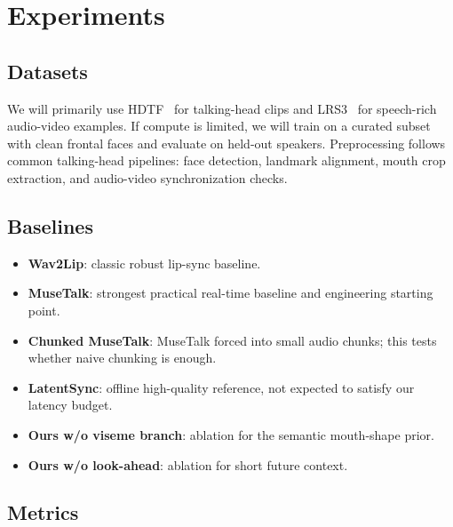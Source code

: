 \documentclass{article}
\begin{document}
\section{Experiments}

\subsection{Datasets}

We will primarily use HDTF~\cite{hdtf} for talking-head clips and LRS3~\cite{lrs3} for speech-rich audio-video examples. If compute is limited, we will train on a curated subset with clean frontal faces and evaluate on held-out speakers. Preprocessing follows common talking-head pipelines: face detection, landmark alignment, mouth crop extraction, and audio-video synchronization checks.

\subsection{Baselines}

\begin{itemize}
    \item \textbf{Wav2Lip}: classic robust lip-sync baseline.
    \item \textbf{MuseTalk}: strongest practical real-time baseline and engineering starting point.
    \item \textbf{Chunked MuseTalk}: MuseTalk forced into small audio chunks; this tests whether naive chunking is enough.
    \item \textbf{LatentSync}: offline high-quality reference, not expected to satisfy our latency budget.
    \item \textbf{Ours w/o viseme branch}: ablation for the semantic mouth-shape prior.
    \item \textbf{Ours w/o look-ahead}: ablation for short future context.
\end{itemize}

\subsection{Metrics}
\end{document}
